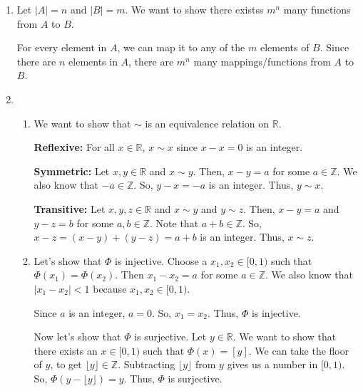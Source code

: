 \documentclass[12pt]{article}
\begin{document}

\begin{enumerate}[start=1,label={\bfseries Problem \arabic*:},leftmargin=1in] %
    \item Let $\left| A \right| = n$ and $\left| B \right| = m$. 
    We want to show there existss $m^{n}$ many functions from $A$ to $B$. 

    For every element in $A$, we can map it to any of the $m$ elements of $B$. 
    Since there are $n$ elements in $A$, there are $m^{n}$ many mappings/functions from $A$ to $B$. 

    \item \begin{enumerate}
        \item We want to show that $\sim$ is an equivalence relation on $\mathbb{R}$. 
        
        \textbf{Reflexive:} For all $x \in \mathbb{R}$, $x \sim x$ since $x - x = 0$ is an integer.

        \textbf{Symmetric:} Let $x, y \in \mathbb{R}$ and $x \sim y$. Then, $x - y = a$ for some $a \in \mathbb{Z}$. 
        We also know that $-a \in \mathbb{Z}$. So, $y - x = -a$ is an integer. Thus, $y \sim x$.

        \textbf{Transitive:} Let $x, y, z \in \mathbb{R}$ and $x \sim y$ and $y \sim z$. 
        Then, $x - y = a$ and $y - z = b$ for some $a, b \in \mathbb{Z}$. Note that $a + b \in \mathbb{Z}$. 
        So, $x - z = (x - y) + (y - z) = a + b$ is an integer. Thus, $x \sim z$.

        \item Let's show that $\Phi$ is injective. Choose a $x_{1}, x_{2} \in [0, 1)$ such that $\Phi(x_{1}) = \Phi(x_{2})$. 
        Then $x_{1} - x_{2} = a$ for some $a \in \mathbb{Z}$. We also know that $\left| x_{1} - x_{2} \right| < 1$ because $x_{1}, x_{2} \in [0, 1)$. 

        Since $a$ is an integer, $a = 0$. So, $x_{1} = x_{2}$. Thus, $\Phi$ is injective. 

        Now let's show that $\Phi$ is surjective. Let $y \in \mathbb{R}$. We want to show that there exists an $x \in [0, 1)$ such that $\Phi(x) = [y]$.
        We can take the floor of $y$, to get $\lfloor y \rfloor \in \mathbb{Z}$. Subtracting $\lfloor y \rfloor$ from $y$ gives us a number in $[0, 1)$.
        So, $\Phi(y - \lfloor y \rfloor) = y$. Thus, $\Phi$ is surjective.
    \end{enumerate}
    

\end{enumerate}
\end{document}
